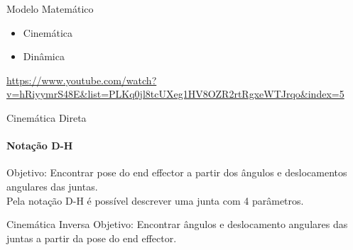 \begin{frame}[c]{Modelo Matemático} 
    \begin{itemize}
        \item Cinemática
        \item Dinâmica
    \end{itemize}
    \url{https://www.youtube.com/watch?v=hRiyymrS48E&list=PLKq0jl8tcUXeg1HV8OZR2rtRgxeWTJrqo&index=5}
\end{frame}
\begin{frame}[c]{Cinemática Direta} 
    \framesubtitle{Notação D-H}
    Objetivo: Encontrar pose do end effector a partir dos ângulos e deslocamentos angulares das juntas. \\
    Pela notação D-H é possível descrever uma junta com 4 parâmetros.\\
\end{frame}
\begin{frame}[c]{Cinemática Inversa} 
    Objetivo: Encontrar ângulos e deslocamento angulares das juntas a partir da pose do end effector.
\end{frame}

